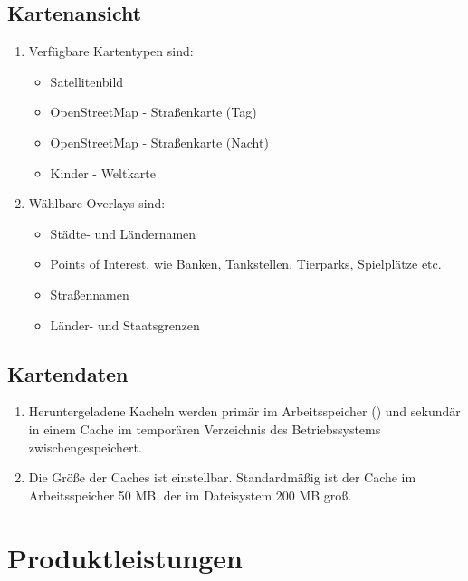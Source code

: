 \documentclass[10pt]{scrreprt}
\begin{document}
\renewcommand{\labelenumi}{\textbf{/D\numprint{\theenumi}0/}}

\section{Kartenansicht}
\begin{enumerate}[leftmargin=2cm]
\item Verfügbare Kartentypen sind:
\begin{itemize}
\item Satellitenbild
\item OpenStreetMap - Straßenkarte (Tag)
\item \W OpenStreetMap - Straßenkarte (Nacht)
\item \W Kinder - Weltkarte
\end{itemize}
\item Wählbare Overlays sind:
\begin{itemize}
\item Städte- und Ländernamen
\item Points of Interest, wie Banken, Tankstellen, Tierparks, Spielplätze etc.
\item Straßennamen
\item \W Länder- und Staatsgrenzen
\end{itemize}
\end{enumerate}
\section{Kartendaten}
\begin{enumerate}[leftmargin=2cm,resume]
\item Heruntergeladene Kacheln werden primär im Arbeitsspeicher (\W) und sekundär in einem Cache im temporären Verzeichnis des Betriebssystems zwischengespeichert.
\item Die Größe der Caches ist einstellbar. Standardmäßig ist der Cache im Arbeitsspeicher 50 MB, der im Dateisystem 200 MB groß.
\end{enumerate}




\chapter{Produktleistungen}

\renewcommand{\labelenumi}{\textbf{/L\numprint{\theenumi}0/}}
\end{document}
